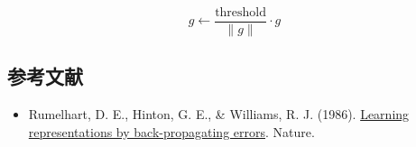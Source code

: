 \[
g\leftarrow \frac{\text{threshold}}{\lVert g\rVert}\cdot g
\]

\FloatBarrier
{}
\hypertarget{ux53c2ux8003ux6587ux732e-2}{%
\subsection{参考文献}\label{ux53c2ux8003ux6587ux732e-2}}

\vspace{0.25em}
\begin{itemize}
\tightlist
\item
  Rumelhart, D. E., Hinton, G. E., \& Williams, R. J. (1986). \href{https://doi.org/10.1038/323533a0}{Learning representations by back-propagating errors}. Nature.
\end{itemize}

\clearpage
